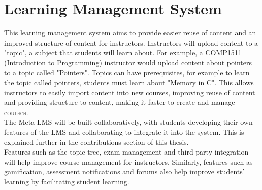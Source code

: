 \section{Learning Management System}
This learning management system aims to provide easier reuse of content and an improved structure of content for instructors. Instructors will upload content to a "topic", a subject that students will learn about. For example, a COMP1511 (Introduction to Programming) instructor would upload content about pointers to a topic called "Pointers". Topics can have prerequisites, for example to learn the topic called pointers, students must learn about "Memory in C". This allows instructors to easily import content into new courses, improving reuse of content and providing structure to content, making it faster to create and manage courses.\\
The Meta LMS will be built collaboratively, with students developing their own features of the LMS and collaborating to integrate it into the system. This is explained further in the contributions section of this thesis. \\
Features such as the topic tree, exam management and third party integration will help improve course management for instructors. Similarly, features such as gamification, assessment notifications and forums also help improve students' learning by facilitating student learning.\\